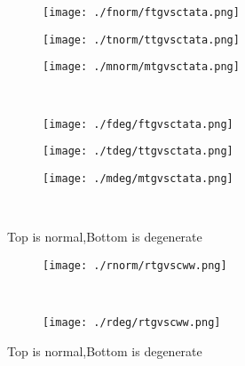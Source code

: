 \documentclass[aps,floats,floatfix,nofootinbib]{revtex4-1}
\begin{document}
\begin{center}
\begin{figure}
\begin{subfigure}{0.3\textwidth}
\texttt{[image: ./fnorm/ftgvsctata.png]}
\label{}
\end{subfigure}
\begin{subfigure}{0.3\textwidth}
\texttt{[image: ./tnorm/ttgvsctata.png]}
\label{}
\end{subfigure}
\begin{subfigure}{0.3\textwidth}
\texttt{[image: ./mnorm/mtgvsctata.png]}
\label{}
\end{subfigure}\\
\begin{subfigure}{0.3\textwidth}
\texttt{[image: ./fdeg/ftgvsctata.png]}
\label{}
\end{subfigure}
\begin{subfigure}{0.3\textwidth}
\texttt{[image: ./tdeg/ttgvsctata.png]}
\label{}
\end{subfigure}
\begin{subfigure}{0.3\textwidth}
\texttt{[image: ./mdeg/mtgvsctata.png]}
\label{}
\end{subfigure}\\
\caption{Top is normal,Bottom is degenerate}
\end{figure}
\end{center}

\begin{center}
\begin{figure}
\begin{subfigure}{0.95\textwidth}
\texttt{[image: ./rnorm/rtgvscww.png]}
\label{}
\end{subfigure}\\
\begin{subfigure}{0.95\textwidth}
\texttt{[image: ./rdeg/rtgvscww.png]}
\label{}
\end{subfigure}
\caption{Top is normal,Bottom is degenerate}
\end{figure}
\end{center}
\end{document}
